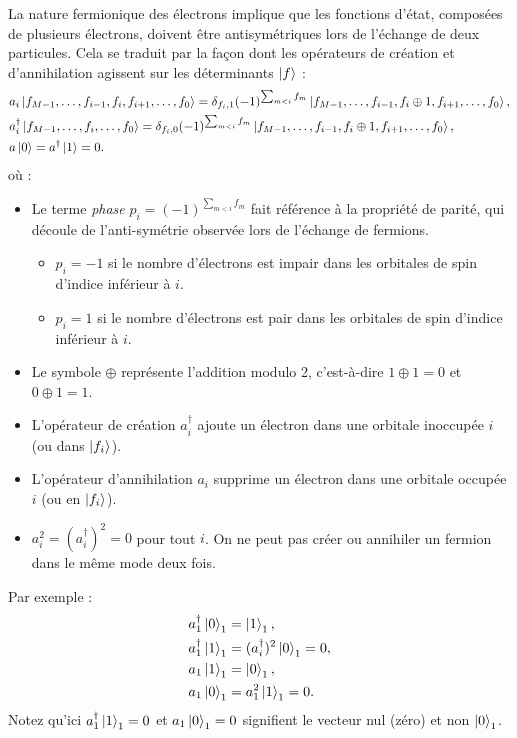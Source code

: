 \documentclass[12pt,a4paper,svgnames,x11names,rgb,table]{article} %
\numberwithin{equation}{section} %
\numberwithin{figure}{section} %
\numberwithin{table}{section} %
\begin{document}
La nature fermionique des électrons implique que les fonctions d'état, composées de plusieurs électrons, doivent être antisymétriques lors de l'échange de deux particules. Cela se traduit par la façon dont les opérateurs de création et d'annihilation agissent sur les déterminants $\ket{f}$ :
\begin{align}\label{eq:fermion_operators}
& a_i \ket{f_{M-1}, \dots, f_{i-1}, f_i, f_{i+1}, \dots, f_0} = \delta_{f_i, 1} (-1)^{\sum_{m < i} f_m} \ket{f_{M-1}, \dots, f_{i-1}, f_i \oplus 1, f_{i+1}, \dots, f_0}, \\
& a^\dagger_i \ket{f_{M-1}, \dots, f_i,  \dots, f_0} = \delta_{f_i, 0} (-1)^{\sum_{m < i} f_m} \ket{f_{M-1}, \dots, f_{i-1}, f_i \oplus 1, f_{i+1}, \dots, f_0}, \\
& a \ket{0} = a^\dagger \ket{1} = 0.
\end{align}
où :
\begin{itemize}
    \item Le terme \textit{phase} $p_i = (-1)^{\sum_{m < i} f_m}$ fait référence à la propriété de parité, qui découle de l'anti-symétrie observée lors de l'échange de fermions.
        \begin{itemize}
            \item $p_i = -1$ si le nombre d'électrons est impair dans les orbitales de spin d'indice inférieur à $i$.
            \item $p_i = 1$ si le nombre d'électrons est pair dans les orbitales de spin d'indice inférieur à $i$.
        \end{itemize}
    \item Le symbole $\oplus$ représente l'addition modulo 2, c'est-à-dire $1 \oplus 1 = 0$ et $0 \oplus 1 = 1$.
    \item L'opérateur de création $a^\dagger_i$ ajoute un électron dans une orbitale inoccupée $i$ (ou dans $\ket{f_i}$).
    \item L'opérateur d'annihilation $a_i$ supprime un électron dans une orbitale occupée $i$ (ou en $\ket{f_i}$).
    \item $a_i^2 = (a^\dagger_i)^2 = 0$ pour tout $i$. On ne peut pas créer ou annihiler un fermion dans le même mode deux fois.
\end{itemize}
Par exemple :
\begin{align}\label{eq:fermion_example}
& a^\dagger_1 \ket{0}_1 = \ket{1}_1, \\
& a^\dagger_1 \ket{1}_1 = (a^\dagger_i)^2 \ket{0}_1 = 0, \\
& a_1 \ket{1}_1 = \ket{0}_1, \\
& a_1 \ket{0}_1 = a_1^2 \ket{1}_1 = 0.
\end{align}
Notez qu'ici $a^\dagger_1 \ket{1}_1 = 0$ et $a_1 \ket{0}_1 = 0$ signifient le vecteur nul (zéro) et non $\ket{0}_1$.
\end{document}
